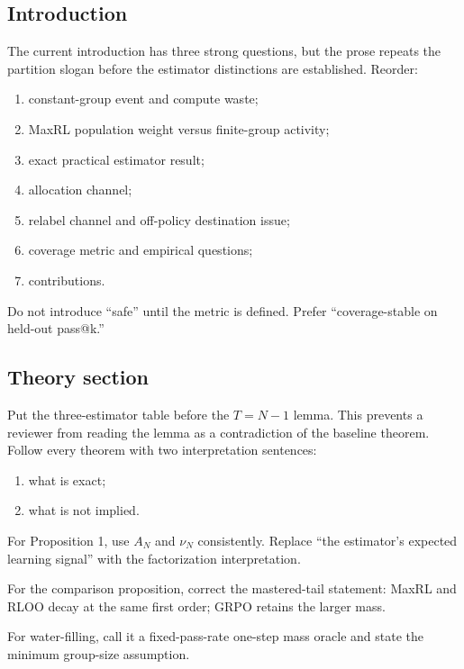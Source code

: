 \documentclass[11pt]{article}
\theoremstyle{definition}
\theoremstyle{remark}
\begin{document}
\subsection{Introduction}

The current introduction has three strong questions, but the prose repeats the partition slogan before the estimator distinctions are established. Reorder:

\begin{enumerate}[leftmargin=2em]
\item constant-group event and compute waste;
\item MaxRL population weight versus finite-group activity;
\item exact practical estimator result;
\item allocation channel;
\item relabel channel and off-policy destination issue;
\item coverage metric and empirical questions;
\item contributions.
\end{enumerate}

Do not introduce ``safe'' until the metric is defined. Prefer ``coverage-stable on held-out pass@k.''

\subsection{Theory section}

Put the three-estimator table before the $T=N-1$ lemma. This prevents a reviewer from reading the lemma as a contradiction of the baseline theorem. Follow every theorem with two interpretation sentences:

\begin{enumerate}[leftmargin=2em]
\item what is exact;
\item what is not implied.
\end{enumerate}

For Proposition 1, use $A_N$ and $\nu_N$ consistently. Replace ``the estimator's expected learning signal'' with the factorization interpretation.

For the comparison proposition, correct the mastered-tail statement: MaxRL and RLOO decay at the same first order; GRPO retains the larger mass.

For water-filling, call it a fixed-pass-rate one-step mass oracle and state the minimum group-size assumption.
\end{document}
